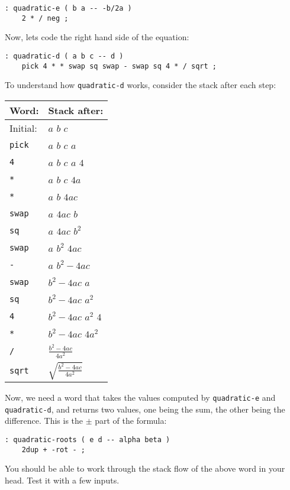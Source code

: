 \documentclass[english]{book}
\begin{document}
\begin{verbatim}
: quadratic-e ( b a -- -b/2a )
    2 * / neg ;
\end{verbatim}

Now, lets code the right hand side of the equation:

\begin{verbatim}
: quadratic-d ( a b c -- d )
    pick 4 * * swap sq swap - swap sq 4 * / sqrt ;
\end{verbatim}

To understand how \texttt{quadratic-d} works, consider the stack after each step:

\begin{tabular}{|l|l|}
\hline
Word:&Stack after:\\
\hline
Initial:&$a$ $b$ $c$\\
\hline
\texttt{pick}&$a$ $b$ $c$ $a$\\
\hline
\texttt{4}&$a$ $b$ $c$ $a$ $4$\\
\hline
\texttt{*}&$a$ $b$ $c$ $4a$\\
\hline
\texttt{*}&$a$ $b$ $4ac$\\
\hline
\texttt{swap}&$a$ $4ac$ $b$\\
\hline
\texttt{sq}&$a$ $4ac$ $b^2$\\
\hline
\texttt{swap}&$a$ $b^2$ $4ac$\\
\hline
\texttt{-}&$a$ $b^2-4ac$\\
\hline
\texttt{swap}&$b^2-4ac$ $a$\\
\hline
\texttt{sq}&$b^2-4ac$ $a^2$\\
\hline
\texttt{4}&$b^2-4ac$ $a^2$ $4$\\
\hline
\texttt{*}&$b^2-4ac$ $4a^2$\\
\hline
\texttt{/}&$\frac{b^2-4ac}{4a^2}$\\
\hline
\texttt{sqrt}&$\sqrt{\frac{b^2-4ac}{4a^2}}$\\
\hline
\end{tabular}

Now, we need a word that takes the values computed by \texttt{quadratic-e} and \texttt{quadratic-d}, and returns two values, one being the sum, the other being the difference. This is the $\pm$ part of the formula:

\begin{verbatim}
: quadratic-roots ( e d -- alpha beta )
    2dup + -rot - ;
\end{verbatim}

You should be able to work through the stack flow of the above word in your head. Test it with a few inputs.
\end{document}
